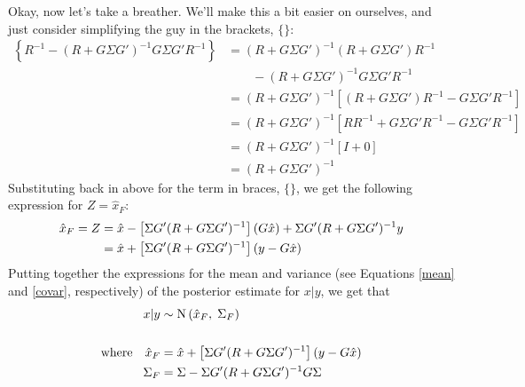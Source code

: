 \documentclass[a4paper,12pt]{scrartcl}
\begin{document}
Okay, now let's take a breather.  We'll make this a bit
easier on ourselves, and just consider simplifying the guy
in the brackets, $\{\}$:
\begin{align*}
    \left\{ R^{-1}  -  (R+ G \Sigma G')^{-1}G\Sigma  
	G' R^{-1} \right\}   &=   
	(R+ G \Sigma G')^{-1} (R+ G \Sigma G') R^{-1}  \\
    &\qquad -  (R+ G \Sigma G')^{-1}G\Sigma  
	G' R^{-1} \\
    &=   (R+ G \Sigma G')^{-1} \left[ (R+ G \Sigma G') R^{-1}  
	-  G\Sigma   G' R^{-1}\right] \\
    &=   (R+ G \Sigma G')^{-1} \left[ RR^{-1} 
	+ G \Sigma G'R^{-1} -  G\Sigma   G' R^{-1}\right] \\
    &=   (R+ G \Sigma G')^{-1} \left[ I 
	+ 0\right] \\
    &=   (R+ G \Sigma G')^{-1} 
\end{align*}
Substituting back in above for the term in braces, 
$\{\}$, we get the following expression
for $Z = \hat{x}_F$:
\begin{align}
    \hat{x}_F = Z &= \hat{x} 
	- \left[\Sigma G' (R + G \Sigma G')^{-1}  \right]
	\left( G \hat{x} \right)  
	+ \Sigma G'  (R+ G \Sigma G')^{-1} y \notag \\
    &= \hat{x} 
	+ \left[\Sigma G' (R + G \Sigma G')^{-1}  \right]
	\left( y - G \hat{x} \right)  
    \label{mean}
\end{align}
Putting together the expressions for the mean and variance
(see Equations \ref{mean} and \ref{covar}, respectively)
of the posterior estimate for $x|y$, we get that
\begin{align}
    x | y &\sim \text{N} \left(\hat{x}_F, \; \Sigma_F\right) \\
    \notag\\
    \text{where} \quad \hat{x}_F &= \hat{x} 
	+ \left[\Sigma G' (R + G \Sigma G')^{-1}  \right]
	\left( y - G \hat{x} \right)  \notag \\
    \Sigma_F &= \Sigma - \Sigma G'(R 
	    + G\Sigma G')^{-1}
	    G\Sigma \notag
\end{align}
\end{document}
